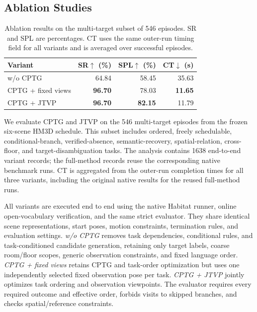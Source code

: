 \documentclass[letterpaper,10pt,journal]{IEEEtran}
\begin{document}
\subsection{Ablation Studies}
\begin{table}[H]
\caption{Ablation results on the multi-target subset of 546 episodes. SR and SPL are percentages. CT uses the same outer-run timing field for all variants and is averaged over successful episodes.}
\label{tab:ablation}\centering\small\setlength{\tabcolsep}{6pt}
\begin{tabular}{lrrr}\toprule
Variant&SR$\uparrow$ (\%)&SPL$\uparrow$ (\%)&CT$\downarrow$ (s)\\\midrule
w/o CPTG&64.84&58.45&35.63\\
CPTG + fixed views&\textbf{96.70}&78.03&\textbf{11.65}\\
CPTG + JTVP&\textbf{96.70}&\textbf{82.15}&11.79\\\bottomrule
\end{tabular}
\end{table}

We evaluate CPTG and JTVP on the 546 multi-target episodes from the frozen six-scene HM3D schedule. This subset includes ordered, freely schedulable, conditional-branch, verified-absence, semantic-recovery, spatial-relation, cross-floor, and target-disambiguation tasks. The analysis contains 1638 end-to-end variant records; the full-method records reuse the corresponding native benchmark runs. CT is aggregated from the outer-run completion times for all three variants, including the original native results for the reused full-method runs.

All variants are executed end to end using the native Habitat runner, online open-vocabulary verification, and the same strict evaluator. They share identical scene representations, start poses, motion constraints, termination rules, and evaluation settings. \emph{w/o CPTG} removes task dependencies, conditional rules, and task-conditioned candidate generation, retaining only target labels, coarse room/floor scopes, generic observation constraints, and fixed language order. \emph{CPTG + fixed views} retains CPTG and task-order optimization but uses one independently selected fixed observation pose per task. \emph{CPTG + JTVP} jointly optimizes task ordering and observation viewpoints. The evaluator requires every required outcome and effective order, forbids visits to skipped branches, and checks spatial/reference constraints.
\end{document}
